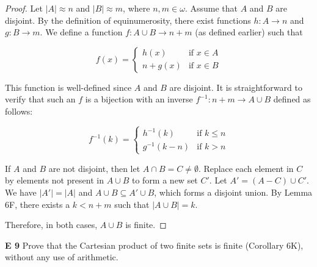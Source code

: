 \begin{proof}
    Let \(|A| \approx n\) and \(|B| \approx m\), where \(n, m \in \omega\). Assume that \(A\) and \(B\) are disjoint. By the definition of equinumerosity, there exist functions \(h: A \rightarrow n\) and \(g: B \rightarrow m\). We define a function \(f: A \cup B \rightarrow n + m\) (as defined earlier) such that

    \[
    f(x) = 
    \begin{cases} 
    h(x) & \text{if } x \in A \\
    n + g(x) & \text{if } x \in B
    \end{cases}
    \]

    This function is well-defined since \(A\) and \(B\) are disjoint. It is straightforward to verify that such an \(f\) is a bijection with an inverse \(f^{-1}: n + m \rightarrow A \cup B\) defined as follows:

    \[
    f^{-1}(k) = 
    \begin{cases} 
    h^{-1}(k) & \text{if } k \leq n \\
    g^{-1}(k - n) & \text{if } k > n
    \end{cases}
    \]

    If \(A\) and \(B\) are not disjoint, then let \(A \cap B = C \neq \emptyset\). Replace each element in \(C\) by elements not present in \(A \cup B\) to form a new set \(C'\). Let \(A' = (A - C) \cup C'\). We have \(|A'| = |A|\) and \(A \cup B \subseteq A' \cup B\), which forms a disjoint union. By Lemma 6F, there exists a \(k < n + m\) such that \(|A \cup B| = k\).

    Therefore, in both cases, \(A \cup B\) is finite.
\end{proof}
\begin{question}
    \textbf{E 9}
    Prove that the Cartesian product of two finite sets is finite (Corollary 6K), without any use of arithmetic.
\end{question}
